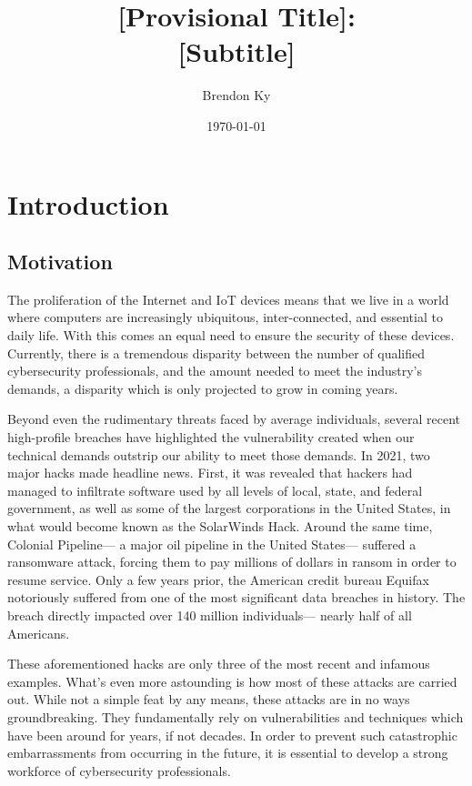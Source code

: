 \documentclass{article}
\title{
    [Provisional Title]: \\
    \large [Subtitle]
}
\author{Brendon Ky}
\date{\today}
\begin{document}
\maketitle

\section{Introduction}

    \subsection{Motivation} %

    The proliferation of the Internet and IoT devices means that we live in a world where computers are increasingly ubiquitous, inter-connected, and essential to daily life. 
    With this comes an equal need to ensure the security of these devices. 
    Currently, there is a tremendous disparity between the number of qualified cybersecurity professionals, and the amount needed to meet the industry's demands, a disparity which is only projected to grow in coming years.
    
    Beyond even the rudimentary threats faced by average individuals, several recent high-profile breaches have highlighted the vulnerability created when our technical demands outstrip our ability to meet those demands. 
    In 2021, two major hacks made headline news. 
    First, it was revealed that hackers had managed to infiltrate software used by all levels of local, state, and federal government, as well as some of the largest corporations in the United States, in what would become known as the SolarWinds Hack.
    Around the same time, Colonial Pipeline---
    a major oil pipeline in the United States---
    suffered a ransomware attack, forcing them to pay millions of dollars in ransom in order to resume service. 
    Only a few years prior, the American credit bureau Equifax notoriously suffered from one of the most significant data breaches in history. 
    The breach directly impacted over 140 million individuals---
    nearly half of all Americans. 
    
    These aforementioned hacks are only three of the most recent and infamous examples. 
    What's even more astounding is how most of these attacks are carried out. 
    While not a simple feat by any means, these attacks are in no ways groundbreaking.
    They fundamentally rely on vulnerabilities and techniques which have been around for years, if not decades. 
    In order to prevent such catastrophic embarrassments from occurring in the future, it is essential to develop a strong workforce of cybersecurity professionals. 
\end{document}
